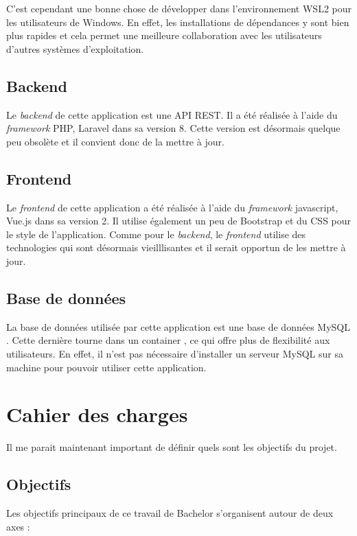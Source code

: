 C'est cependant une bonne chose de développer dans l'environnement WSL2 pour les utilisateurs de Windows. En effet, les installations de dépendances y sont bien plus rapides et cela permet une meilleure collaboration avec les utilisateurs d'autres systèmes d'exploitation.

\subsection{Backend}
Le \emph{backend} de cette application est une API REST. Il a été réalisée à l'aide du \emph{framework} PHP, Laravel dans sa version 8. Cette version est désormais quelque peu obsolète et il convient donc de la mettre à jour.

\subsection{Frontend}
Le \emph{frontend} de cette application a été réalisée à l'aide du \emph{framework} javascript, Vue.js dans sa version 2. Il utilise également un peu de Bootstrap et du CSS pour le style de l'application. Comme pour le \emph{backend}, le \emph{frontend} utilise des technologies qui sont désormais vieilllisantes et il serait opportun de les mettre à jour.

\subsection{Base de données}
La base de données utilisée par cette application est une base de données MySQL \cite{MySQL}. Cette dernière tourne dans un container  \cite{Docker}, ce qui offre plus de flexibilité aux utilisateurs. En effet, il n'est pas nécessaire d'installer un serveur MySQL sur sa machine pour pouvoir utiliser cette application.

\section{Cahier des charges}
Il me parait maintenant important de définir quels sont les objectifs du projet.

\subsection{Objectifs}
Les objectifs principaux de ce travail de Bachelor s'organisent autour de deux axes :

